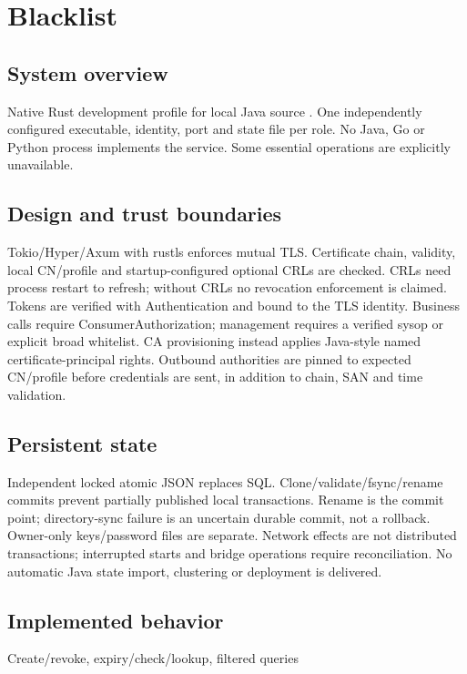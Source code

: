 \documentclass[a4paper]{arrowhead}
\begin{document}
\ArrowheadSetup
\section{Blacklist}
\subsection{System overview}
Native Rust development profile for local Java source . One independently configured executable, identity, port and state file per role. No Java, Go or Python process implements the service. Some essential operations are explicitly unavailable.
\subsection{Design and trust boundaries}
Tokio/Hyper/Axum with rustls enforces mutual TLS. Certificate chain, validity, local CN/profile and startup-configured optional CRLs are checked. CRLs need process restart to refresh; without CRLs no revocation enforcement is claimed. Tokens are verified with Authentication and bound to the TLS identity. Business calls require ConsumerAuthorization; management requires a verified sysop or explicit broad whitelist. CA provisioning instead applies Java-style named certificate-principal rights. Outbound authorities are pinned to expected CN/profile before credentials are sent, in addition to chain, SAN and time validation.
\subsection{Persistent state}
Independent locked atomic JSON replaces SQL. Clone/validate/fsync/rename commits prevent partially published local transactions. Rename is the commit point; directory-sync failure is an uncertain durable commit, not a rollback. Owner-only keys/password files are separate. Network effects are not distributed transactions; interrupted starts and bridge operations require reconciliation. No automatic Java state import, clustering or deployment is delivered.
\subsection{Implemented behavior}
Create/revoke, expiry/check/lookup, filtered queries
\end{document}
